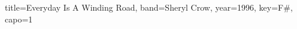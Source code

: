 \documentclass{../../tex/bekki-leadsheet}
\begin{document}
\begin{song}[transpose-capo=true]{title={Everyday Is A Winding Road}, band={Sheryl Crow}, year={1996}, key={F#}, capo={1}}

  

\end{song}
\end{document}
